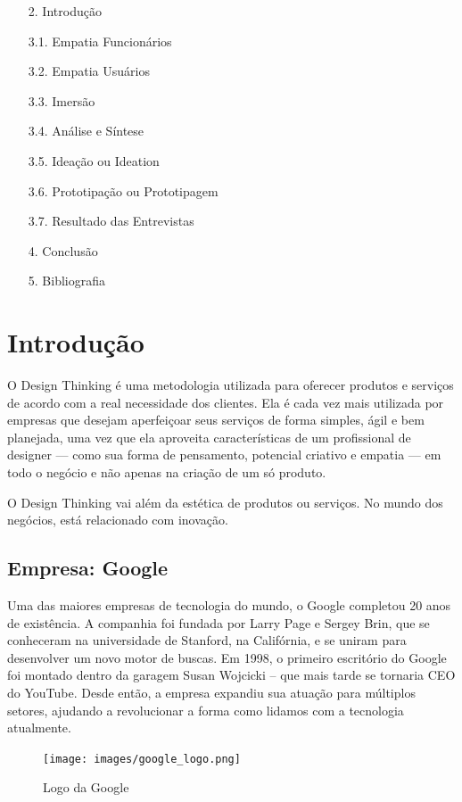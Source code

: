 \documentclass[a4paper]{article}
\begin{document}
\begin{itemize}
    \item[2.] Introdução 
    \item[3.1.] Empatia Funcionários 
    \item[3.2.] Empatia Usuários 
    \item[3.3.] Imersão 
    \item[3.4.] Análise e Síntese 
    \item[3.5.] Ideação ou Ideation 
    \item[3.6.] Prototipação ou Prototipagem 
    \item[3.7.] Resultado das Entrevistas 
    \item[4.] Conclusão 
    \item[5.] Bibliografia 
\end{itemize}
\vfill
\pagebreak
\section{Introdução}
\par O Design Thinking é uma metodologia utilizada para oferecer produtos e serviços de acordo com a real necessidade dos clientes. Ela é cada vez mais utilizada por empresas que desejam aperfeiçoar seus serviços de forma simples, ágil e bem planejada, uma vez que ela aproveita características de um profissional de designer — como sua forma de pensamento, potencial criativo e empatia — em todo o negócio e não apenas na criação de um só produto.
\par O Design Thinking vai além da estética de produtos ou serviços. No mundo dos negócios, está relacionado com inovação.
\subsection{Empresa: Google}
\par Uma das maiores empresas de tecnologia do mundo, o Google completou 20 anos de existência. A companhia foi fundada por Larry Page e Sergey Brin, que se conheceram na universidade de Stanford, na Califórnia, e se uniram para desenvolver um novo motor de buscas. Em 1998, o primeiro escritório do Google foi montado dentro da garagem Susan Wojcicki – que mais tarde se tornaria CEO do YouTube. Desde então, a empresa expandiu sua atuação para múltiplos setores, ajudando a revolucionar a forma como lidamos com a tecnologia atualmente. \\[1cm]
\begin{figure}[h]
    \centering
    \texttt{[image: images/google\_logo.png]}
    \caption{Logo da Google}
    \label{fig:my_label}
\end{figure}
\end{document}
